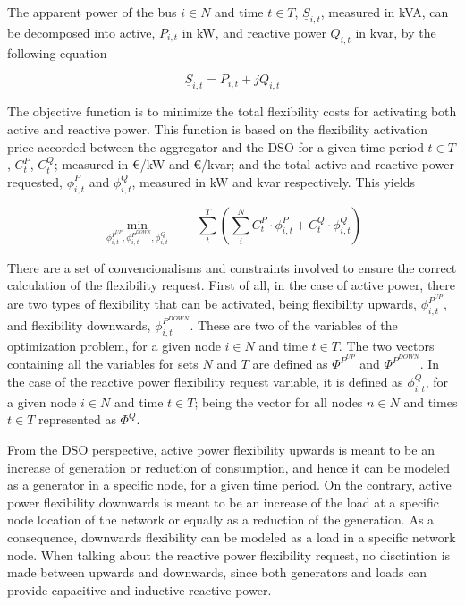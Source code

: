 The apparent power of the bus $i \in N$ and time $t \in T$, $\underline{S}_{i,t}$, measured in kVA, can be decomposed into active, $P_{i,t}$ in kW, and reactive power $Q_{i,t}$ in kvar, by the following equation 

\begin{equation*}
\underline{S}_{i,t} = P_{i,t} + jQ_{i,t}
\end{equation*}

The objective function is to minimize the total flexibility costs for activating both active and reactive power. This function is based on the flexibility activation price accorded between the aggregator and the DSO for a given time period $t \in T$, $C_t^{P}$, $C_t^{Q}$; measured in \euro/kW and \euro/kvar;  and the total active and reactive power requested, $\phi_{i,t}^{P}$ and $\phi_{i,t}^{Q}$, measured in kW and kvar respectively. This yields

\begin{equation*}
\!\min_{\phi_{i,t}^{P^{UP}},\phi_{i,t}^{P^{DOWN}},\phi_{i,t}^{Q}}  \qquad \sum_{t}^{T} \left( \sum_{i}^{N} C_t^{P} \cdot \phi_{i,t}^{P} + C_t^{Q} \cdot \phi_{i,t}^{Q} \right)  
\end{equation*}

There are a set of convencionalisms and constraints involved to ensure the correct calculation of the flexibility request. First of all, in the case of active power, there are two types of flexibility that can be activated, being flexibility upwards, $\phi_{i,t}^{P^{UP}}$, and flexibility downwards, $\phi_{i,t}^{P^{DOWN}}$. These are two of the variables of the optimization problem, for a given node $i \in N$ and time $t \in T$. The two vectors containing all the variables for sets $N$ and $T$ are defined as $\Phi^{P^{UP}}$ and $\Phi^{P^{DOWN}}$. In the case of the reactive power flexibility request variable, it is defined as $\phi_{i,t}^{Q}$, for a given node $i \in N$ and time $t \in T$; being the vector for all nodes $n \in N$ and times $t \in T$ represented as $\Phi^{Q}$.

From the DSO perspective, active power flexibility upwards is meant to be an increase of generation or reduction of consumption, and hence it can be modeled as a generator in a specific node, for a given time period. On the contrary, active power flexibility downwards is meant to be an increase of the load at a specific node location of the network or equally as a reduction of the generation. As a consequence, downwards flexibility can be modeled as a load in a specific network node. When talking about the reactive power flexibility request, no disctintion is made between upwards and downwards, since both generators and loads can provide capacitive and inductive reactive power. 

